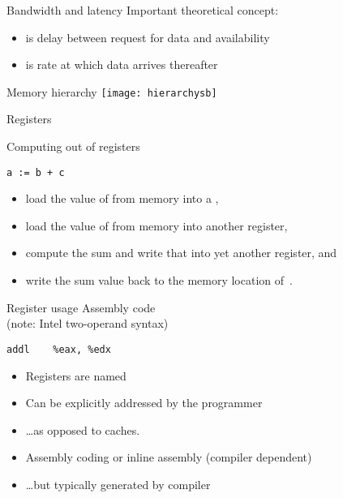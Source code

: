 \begin{numberedframe}{Bandwidth and latency}
  Important theoretical concept:
  \begin{itemize}
  \item {} is delay between request for data and availability
  \item {} is rate at which data arrives thereafter
  \end{itemize}
\end{numberedframe}

\begin{numberedframe}{Memory hierarchy}
  \texttt{[image: hierarchysb]}  
\end{numberedframe}

 {Registers}

\begin{numberedframe}{Computing out of registers}
\begin{verbatim}
a := b + c
\end{verbatim}
\begin{itemize}
\item load the value of  from memory into a ,
\item load the value of  from memory into another register,
\item compute the sum and write that into yet another register, and
\item write the sum value back to the memory location of~.
\end{itemize}
\end{numberedframe}

\begin{numberedframe}{Register usage}
  Assembly code\\
  (note: Intel two-operand syntax)
\begin{verbatim}
addl	%eax, %edx
\end{verbatim}  
\begin{itemize}
\item Registers are named
\item Can be explicitly addressed by the programmer
\item \ldots as opposed to caches.
\item Assembly coding or inline assembly (compiler dependent)
\item \ldots but typically generated by compiler
\end{itemize}
\end{numberedframe}

